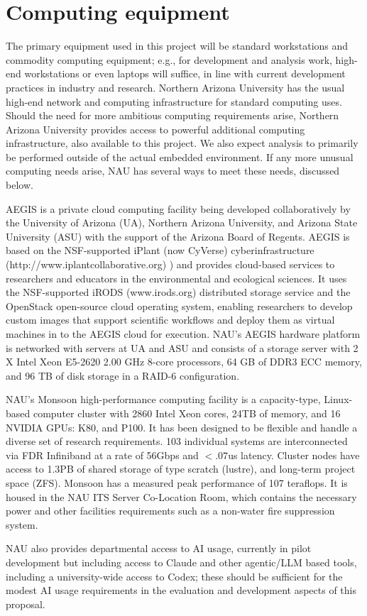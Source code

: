 \documentclass[12pt]{article}
\begin{document}
\begin{center}
{\large\sf\textbf{\proptitle}}
\end{center}

\section*{Computing equipment}

The primary equipment used in this project will be standard workstations and commodity computing equipment; e.g., for development and analysis work, high-end workstations or even laptops will suffice, in line with current development practices in industry and research. Northern Arizona University has the usual high-end network and computing infrastructure for standard computing uses.  Should the need for more ambitious computing requirements arise, Northern Arizona University provides access to powerful additional computing infrastructure, also available to this project.  We also expect analysis to primarily be performed outside of the actual embedded environment.  If any more unusual computing needs arise, NAU has several ways to meet these needs, discussed below.

AEGIS is a private cloud computing facility being developed collaboratively by the University of Arizona (UA), Northern Arizona University, and Arizona State University (ASU) with the support of the Arizona Board of Regents. AEGIS is based on the NSF-supported iPlant (now CyVerse) cyberinfrastructure (http://www.iplantcollaborative.org) ) and provides cloud-based services to researchers and educators in the environmental and ecological sciences. It uses the NSF-supported iRODS (www.irods.org) distributed storage service and the OpenStack open-source cloud operating system, enabling researchers to develop custom images that support scientific workflows and deploy them as virtual machines in to the AEGIS cloud for execution. NAU’s AEGIS hardware platform is networked with servers at UA and ASU and consists of a storage server with 2 X Intel Xeon E5-2620 2.00 GHz 8-core processors, 64 GB of DDR3 ECC memory, and 96 TB of disk storage in a RAID-6 configuration.

NAU’s Monsoon high-performance computing facility is a capacity-type, Linux-based computer cluster with 2860 Intel Xeon cores, 24TB of memory, and 16 NVIDIA GPUs: K80, and P100. It has been designed to be flexible and handle a diverse set of research requirements. 103 individual systems are interconnected via FDR Infiniband at a rate of 56Gbps and $<.07$us latency. Cluster nodes have access to 1.3PB of shared storage of type scratch (lustre), and long-term project space (ZFS). Monsoon has a measured peak performance of 107 teraflops. It is housed in the NAU ITS Server Co-Location Room, which contains the necessary power and other facilities requirements such as a non-water fire suppression system.

NAU also provides departmental access to AI usage, currently in pilot development but including access to Claude and other agentic/LLM based tools, including a university-wide access to Codex; these should be sufficient for the modest AI usage requirements in the evaluation and development aspects of this proposal.
\end{document}
